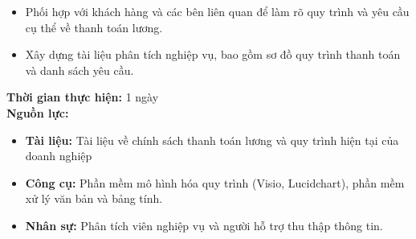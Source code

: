 {\begin{minipage}{\textwidth}
\begin{itemize}
        \item Phối hợp với khách hàng và các bên liên quan để làm rõ quy trình và yêu cầu cụ thể về thanh toán lương.
        \item Xây dựng tài liệu phân tích nghiệp vụ, bao gồm sơ đồ quy trình thanh toán và danh sách yêu cầu.
    \end{itemize}
    \noindent \textbf{Thời gian thực hiện:} 1 ngày \\
    \noindent \textbf{Nguồn lực:}
    \begin{itemize}
        \item \textbf{Tài liệu:} Tài liệu về chính sách thanh toán lương và quy trình hiện tại của doanh nghiệp
        \item \textbf{Công cụ:} Phần mềm mô hình hóa quy trình (Visio, Lucidchart), phần mềm xử lý văn bản và bảng tính.
        \item \textbf{Nhân sự:} Phân tích viên nghiệp vụ và người hỗ trợ thu thập thông tin.
    \end{itemize}
    \end{minipage}
}
\newpage %
